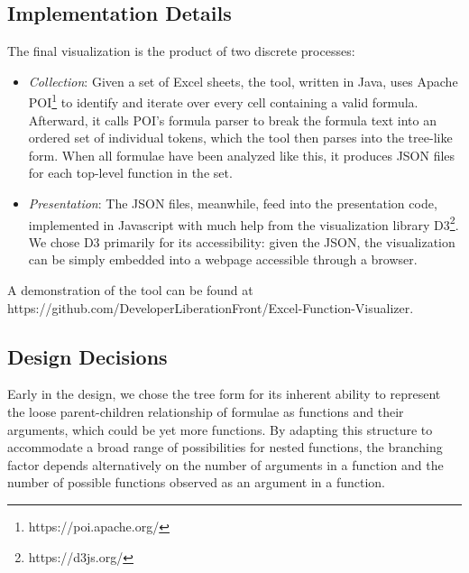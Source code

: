 \documentclass[conference]{IEEEtran}
\begin{document}
	\subsection{Implementation Details} The final visualization is the
	product of two discrete processes: \begin{itemize} \item \textit{Collection}:
		Given a set of Excel sheets, the tool, written in Java, uses Apache
		POI\footnote{https://poi.apache.org/} to identify and iterate over every cell
		containing a valid formula. Afterward, it calls POI's formula parser to break
		the formula text into an ordered set of individual tokens, which the tool then
		parses into the tree-like form. When all formulae have
		been analyzed like this, it produces JSON files for each top-level function in
		the set. 
		
		\item \textit{Presentation}: The JSON files, meanwhile, feed into the
		presentation code, implemented in Javascript with much help from the
		visualization library D3\footnote{https://d3js.org/}. We chose D3 primarily for
		its accessibility: given the JSON, the visualization can be simply
		embedded into a webpage accessible through a browser. \end{itemize} A
	demonstration of the tool can be found at https://github.com/DeveloperLiberationFront/Excel-Function-Visualizer.
	
	\subsection{Design Decisions} \label{ssec:decisions}
	Early in the design, we chose the tree form for its inherent ability to
	represent the loose parent-children relationship of formulae as
	functions and their arguments, which could be yet more functions. By adapting
	this structure to accommodate a broad range of possibilities for nested
	functions, the branching factor depends alternatively on the number of arguments in a
	function and the number of possible functions observed as an argument in a
	function. \par
	
\end{document}
